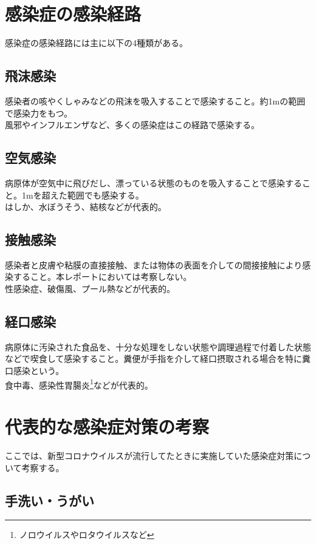 \documentclass{ltjsarticle}
\begin{document}
\section{感染症の感染経路}

感染症の感染経路には主に以下の4種類がある。

\subsection{飛沫感染}

感染者の咳やくしゃみなどの飛沫を吸入することで感染すること。約1mの範囲で感染力をもつ。\\
風邪やインフルエンザなど、多くの感染症はこの経路で感染する。

\subsection{空気感染}

病原体が空気中に飛びだし、漂っている状態のものを吸入することで感染すること。1mを超えた範囲でも感染する。\\
はしか、水ぼうそう、結核などが代表的。

\subsection{接触感染}

感染者と皮膚や粘膜の直接接触、または物体の表面を介しての間接接触により感染すること。本レポートにおいては考察しない。\\
性感染症、破傷風、プール熱などが代表的。

\subsection{経口感染}

病原体に汚染された食品を、十分な処理をしない状態や調理過程で付着した状態などで喫食して感染すること。糞便が手指を介して経口摂取される場合を特に糞口感染という。\\
食中毒、感染性胃腸炎\footnote[2]{ノロウイルスやロタウイルスなど}などが代表的。

\section{代表的な感染症対策の考察}

ここでは、新型コロナウイルスが流行してたときに実施していた感染症対策について考察する。

\subsection{手洗い・うがい}
\end{document}
